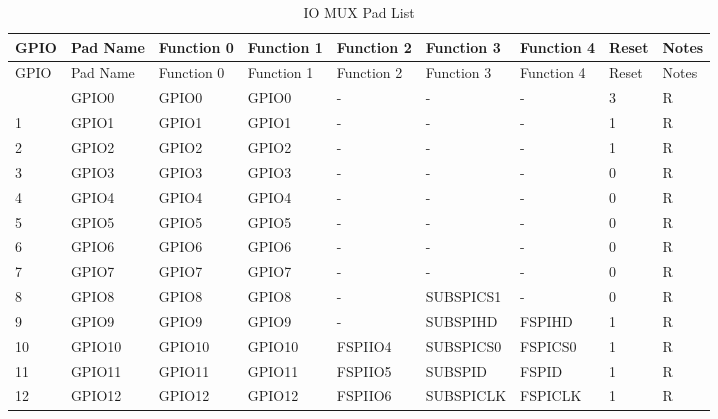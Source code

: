 
   \begin{longtable}[c]{|p{0.7cm}|p{1.9cm}|p{1.9cm}|p{1.6cm}|p{1.6cm}|p{1.8cm}|p{1.6cm}|p{0.7cm}|p{0.7cm}| }
   \caption{IO MUX Pad List}
    \label{table:iomux_pads} \\
        \hline
        \rowcolor{lightgray}
GPIO & Pad Name & Function 0 & Function 1 & Function 2 & Function 3 & Function 4 & Reset & Notes \\
 \hline
\endfirsthead
        \hline
        \rowcolor{lightgray}
        GPIO & Pad Name & Function 0 & Function 1 & Function 2 & Function 3 & Function 4 & Reset & Notes \\
        \hline
        \endhead
        \endfoot
0 & GPIO0            & GPIO0         & GPIO0   & -          & -            & -           & 3 & R \\ \hline
1 & GPIO1            & GPIO1         & GPIO1   & -          & -            & -           & 1 & R \\ \hline
2 & GPIO2            & GPIO2         & GPIO2   & -          & -            & -           & 1 & R \\ \hline
3 & GPIO3            & GPIO3         & GPIO3   & -          & -            & -           & 0 & R \\ \hline
4 & GPIO4            & GPIO4         & GPIO4   & -          & -            & -           & 0 & R \\ \hline
5 & GPIO5            & GPIO5         & GPIO5   & -          & -            & -           & 0 & R \\ \hline
6 & GPIO6            & GPIO6         & GPIO6   & -          & -            & -           & 0 & R \\ \hline
7 & GPIO7            & GPIO7         & GPIO7   & -          & -            & -           & 0 & R \\ \hline
8 & GPIO8            & GPIO8         & GPIO8   & -          & SUBSPICS1    & -           & 0 & R \\ \hline
9 & GPIO9            & GPIO9         & GPIO9   & -          & SUBSPIHD     & FSPIHD      & 1 & R \\ \hline
10 & GPIO10          &  GPIO10       & GPIO10  & FSPIIO4    & SUBSPICS0    & FSPICS0     & 1 & R \\ \hline
11 & GPIO11          &  GPIO11       & GPIO11  & FSPIIO5    & SUBSPID      & FSPID       & 1 & R \\ \hline
12 & GPIO12          &  GPIO12       & GPIO12  & FSPIIO6    & SUBSPICLK    & FSPICLK     & 1 & R \\ \hline

\end{longtable}
